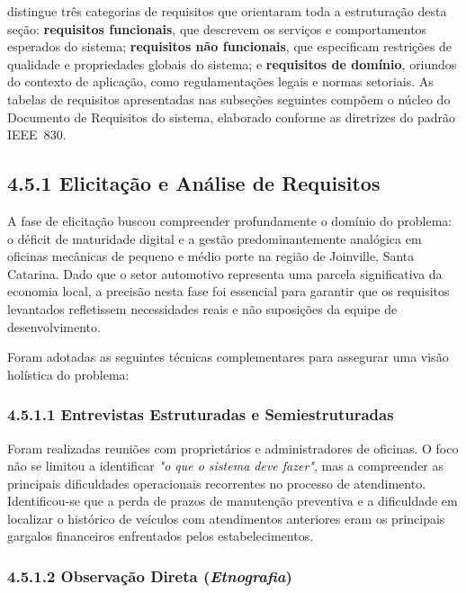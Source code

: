 \documentclass[12pt, a4paper]{article}
\begin{document}
 distingue três categorias de requisitos que
orientaram toda a estruturação desta seção: \textbf{requisitos funcionais},
que descrevem os serviços e comportamentos esperados do sistema;
\textbf{requisitos não funcionais}, que especificam restrições de qualidade e
propriedades globais do sistema; e \textbf{requisitos de domínio}, oriundos do
contexto de aplicação, como regulamentações legais e normas setoriais. As
tabelas de requisitos apresentadas nas subseções seguintes compõem o núcleo do
Documento de Requisitos do sistema, elaborado conforme as diretrizes do padrão
IEEE~830.

\subsection{4.5.1 Elicitação e Análise de Requisitos}
\label{subsec:elicitacao}

A fase de elicitação buscou compreender profundamente o domínio do problema: o
déficit de maturidade digital e a gestão predominantemente analógica em
oficinas mecânicas de pequeno e médio porte na região de Joinville, Santa
Catarina. Dado que o setor automotivo representa uma parcela significativa da
economia local, a precisão nesta fase foi essencial para garantir que os
requisitos levantados refletissem necessidades reais e não suposições da equipe
de desenvolvimento.

Foram adotadas as seguintes técnicas complementares para assegurar uma visão
holística do problema:

\subsubsection{4.5.1.1 Entrevistas Estruturadas e Semiestruturadas}

Foram realizadas reuniões com proprietários e administradores de oficinas. O
foco não se limitou a identificar \textit{"o que o sistema deve fazer"}, mas a
compreender as principais dificuldades operacionais recorrentes no processo de
atendimento. Identificou-se que a perda de prazos de manutenção preventiva e a
dificuldade em localizar o histórico de veículos com atendimentos anteriores
eram os principais gargalos financeiros enfrentados pelos estabelecimentos.

\subsubsection{4.5.1.2 Observação Direta (\textit{Etnografia})}
\end{document}
